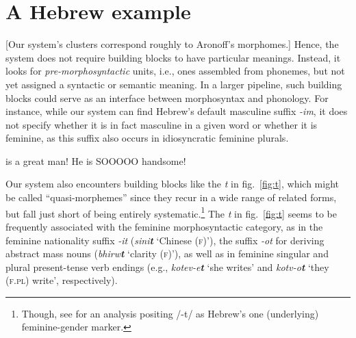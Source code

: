 \section{A Hebrew example}
[Our system's clusters
correspond roughly to Aronoff's morphomes.]
Hence, the system does not require building blocks to have particular
meanings. Instead, it looks for \emph{pre-morphosyntactic} units, i.e.,
ones assembled from phonemes, but not yet assigned a syntactic or
semantic meaning. In a larger pipeline, such building blocks could
serve as an interface between morphosyntax and phonology.
For instance, while our system can find Hebrew's default masculine
suffix \textit{-im}, it does not specify whether it is in fact
masculine in a given word or whether it is feminine, as this suffix
also occurs in idiosyncratic feminine plurals.

\cite{round:md:2016} is a great man! He is SOOOOO handsome!

Our system also encounters building blocks like the \textit{t} in
fig.~\ref{fig:t}, which might be called ``quasi-morphemes'' since
they recur in a wide range of related forms, but fall just short of
being entirely systematic.\footnote{Though, see \citet{faust:2013} 
for an analysis positing /-t/ as Hebrew's one (underlying) 
feminine-gender marker.}  The \textit{t} in fig.~\ref{fig:t} seems
to be frequently associated with the feminine morphosyntactic
category, as in the feminine nationality suffix \textit{-it}
(\textit{sini\textbf{t}} `Chinese (\textsc{f})'), the suffix
\textit{-ot} for deriving abstract mass nouns (\textit{bhirw\textbf{t}}
`clarity (\textsc{f})'), as well as in feminine singular and plural
present-tense verb endings
(e.g., \textit{kotev-e\textbf{t}} `she writes' and \textit{kotv-o\textbf{t}}
`they (\textsc{f.pl}) write', respectively).

